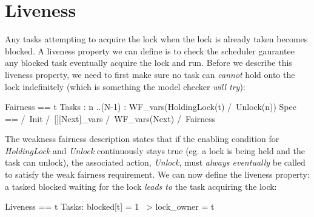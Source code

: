 \section{Liveness}

Any tasks attempting to acquire the lock when the lock is already taken becomes
blocked. A liveness property we can define is to check the scheduler gaurantee
any blocked task eventually acquire the lock and run. Before we describe this
liveness property, we need to first make sure no task can \textit{cannot} hold
onto the lock indefinitely (which is something the model checker \textit{will
try}):\newline

\begin{tla}
Fairness ==
    \A t \in Tasks :
        \A n ..(N-1) :
            WF_vars(HoldingLock(t) /\ Unlock(n))
Spec ==
  /\ Init
  /\ [][Next]_vars
  /\ WF_vars(Next)
  /\ Fairness 
\end{tla}
\begin{tlatex}
%
%
%
%
%
%
%
%
%
\end{tlatex}
\newline

The weakness fairness description states that if the enabling condition for
\textit{HoldingLock} and \textit{Unlock} continuously stays true (eg. a lock is
being held and the task can unlock), the associated action, \textit{Unlock},
must \textit{always eventually} be called to satisfy the weak fairness
requirement. We can now define the liveness property: a tasked blocked waiting
for the lock \textit{leads to} the task acquiring the lock:\newline

\begin{tla}
Liveness == 
    \A t \in Tasks:
        blocked[t] = 1 ~> lock_owner = t
\end{tla}
\begin{tlatex}
%
%
%
\end{tlatex}
\newline
